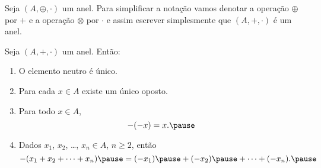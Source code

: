 \documentclass{beamer}
\begin{document}
    \begin{frame}
        \begin{observacao}
            Seja $(A, \oplus, \cdot)$ \pause um anel. \pause Para simplificar a nota\c{c}\~ao \pause vamos denotar a opera\c{c}\~ao $\oplus$ \pause por $+$ \pause e a opera\c{c}\~ao $\otimes$ \pause por $\cdot$ \pause e assim escrever simplesmente \pause que $(A, +, \cdot)$ \pause \'e um anel.\pause
        \end{observacao}
    \end{frame}

    \begin{frame}
        \begin{proposicao}
            Seja $(A, + , \cdot)$ um anel. \pause Ent\~ao:\pause
            \begin{enumerate}[label={\roman*})]
                \item O elemento neutro {\'e} {\'u}nico.\pause

                \vspace{.5cm}

                \item Para cada $x \in A$ \pause existe um {\'u}nico oposto.\pause

                \vspace{.5cm}
                
                \item Para todo $x \in A$, \pause
                \[
                    -(-x) = x.\pause
                \]

                \vspace{.5cm}
                
                \item Dados $x_{1}$, \pause $x_{2}$, \pause \dots, $x_n \in A$, \pause $n \geqslant 2$, \pause ent{\~a}o\pause
                \[
                    -(x_1 + x_2 + \dots + x_n) \pause = (-x_1) \pause + (-x_2) \pause + \dots + (-x_n).\pause
                \]

                \vspace{.2cm}

                \seti
            \end{enumerate}
        \end{proposicao}
    \end{frame}
\end{document}
